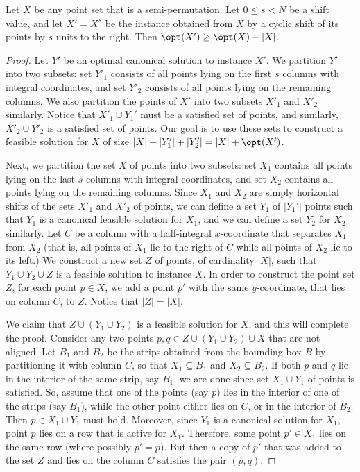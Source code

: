 \begin{claim}\label{claim: shifting does not hurt opt}
Let $X$ be any point set that is a semi-permutation. Let $0\leq s<N$ be a shift value, and let $X'=X^s$ be the instance obtained from $X$ by a cyclic shift of its points by $s$ units to the right. 
Then $\opt(X')\geq \opt(X)-|X|$.
\end{claim}
\begin{proof}

Let $Y'$ be an optimal canonical solution to instance $X'$. 
We partition $Y'$ into two subsets: set $Y'_1$ consists of all points lying on the first $s$ columns with integral coordinates, and set $Y'_2$ consists of all points lying on the remaining columns. 
We also partition the points of $X'$ into two subsets $X'_1$ and $X'_2$ similarly.  Notice that $X'_1\cup Y_1'$ must be a satisfied set of points, and similarly, $X'_2\cup Y'_2$ is a satisfied set of points.
Our goal is to use these sets to construct a feasible solution for $X$ of size $|X|+|Y'_1| + |Y'_2| = |X|+\opt(X')$.
	
Next, we partition the set $X$ of points into two subsets: set $X_1$ contains all points lying on the last $s$ columns with integral coordinates, and set $X_2$ contains all points lying on the remaining columns. 
Since $X_1$ and $X_2$ are simply horizontal shifts of the sets $X'_1$ and $X'_2$ of points, we can define a set $Y_1$ of $|Y_1'|$ points such that $Y_1$ is a canonical feasible solution for $X_1$, and we can define a set $Y_2$ for $X_2$ similarly. 
%
Let $C$ be a column with a half-integral $x$-coordinate that separates $X_1$ from $X_2$ (that is, all points of $X_1$ lie to the right of $C$ while all points of $X_2$ lie to its left.) We construct a new set $Z$ of points, of cardinality $|X|$, such that $Y_1\cup Y_2\cup Z$ is a feasible solution to instance $X$. In order to construct the point set $Z$,
for each point $p \in X$, we add a point $p'$ with the same $y$-coordinate, that lies on column $C$, to $Z$. Notice that $|Z|=|X|$.

 
We claim that $Z \cup (Y_1 \cup Y_2)$ is a feasible solution  for $X$, and this will complete the proof.  
Consider any two points $p,q \in Z \cup (Y_1 \cup Y_2) \cup X$ that are not aligned.
Let $B_1$ and $B_2$ be the strips obtained from the bounding box $B$ by partitioning it with column $C$, so that $X_1\subseteq B_1$ and $X_2\subseteq B_2$. 
If both $p$ and $q$ lie in the interior of the same strip, say $B_1$, we are done since set $X_1\cup Y_1$ of points is satisfied.
So, assume that  one of the points (say $p$) lies in the interior of one of the strips (say $B_1$), while the other point either lies on $C$, or in the interior of $B_2$. Then $p\in X_1\cup Y_1$ must hold. Moreover, since $Y_1$ is a canonical solution for $X_1$, point $p$ lies on a row that is active for $X_1$. Therefore, some point $p'\in X_1$ lies on the same row (where possibly $p'=p$). But then a copy of $p'$ that was added to the set $Z$ and lies on the column $C$ satisfies the pair $(p,q)$.     
\end{proof}


